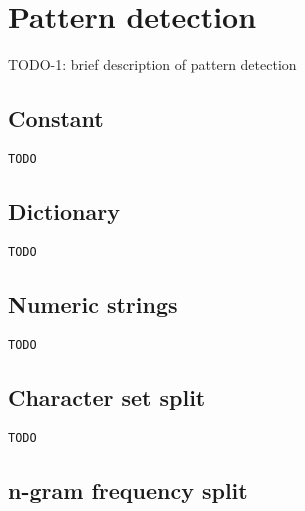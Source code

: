 \section{Pattern detection}
\label{sec:pd}





% 

TODO-1: brief description of pattern detection



\subsection{Constant}
\label{subsec:pd:constant}

\begin{verbatim}
TODO
\end{verbatim}

\subsection{Dictionary}
\label{subsec:pd:dict}

\begin{verbatim}
TODO
\end{verbatim}

\subsection{Numeric strings}
\label{subsec:pd:numericstrings}

\begin{verbatim}
TODO
\end{verbatim}

\subsection{Character set split}
\label{subsec:pd:charsetsplit}

\begin{verbatim}
TODO
\end{verbatim}

\subsection{n-gram frequency split}
\label{subsec:pd:ngramfreqsplit}

